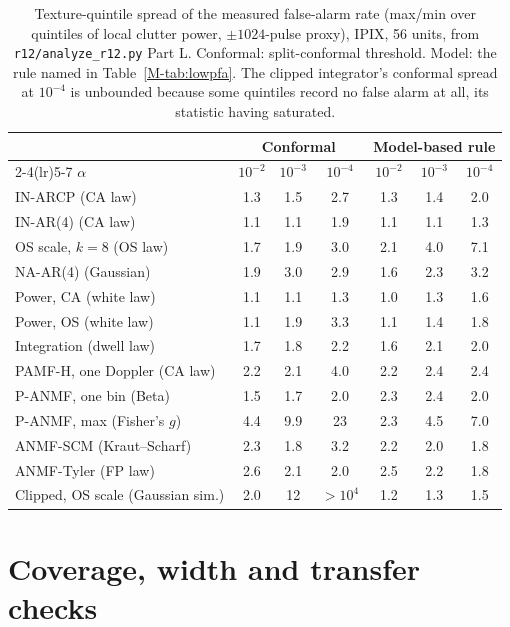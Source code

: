 \documentclass[10pt]{article}
\begin{document}
\begin{table}[h]
\centering\small
\caption{Texture-quintile spread of the measured false-alarm rate (max/min over quintiles of
local clutter power, $\pm1024$-pulse proxy), IPIX, 56 units, from \texttt{r12/analyze\_r12.py}
Part L. Conformal: split-conformal threshold. Model: the rule named in
Table~\ref{M-tab:lowpfa}. The clipped integrator's conformal spread at $10^{-4}$ is unbounded
because some quintiles record no false alarm at all, its statistic having saturated.}
\label{tab:pivot}
\begin{tabular}{lcccccc}
\toprule
 & \multicolumn{3}{c}{Conformal} & \multicolumn{3}{c}{Model-based rule}\\
\cmidrule(lr){2-4}\cmidrule(lr){5-7}
$\alpha$ & $10^{-2}$ & $10^{-3}$ & $10^{-4}$ & $10^{-2}$ & $10^{-3}$ & $10^{-4}$\\
\midrule
IN-ARCP (CA law) & 1.3 & 1.5 & 2.7 & 1.3 & 1.4 & 2.0\\
IN-AR(4) (CA law) & 1.1 & 1.1 & 1.9 & 1.1 & 1.1 & 1.3\\
OS scale, $k=8$ (OS law) & 1.7 & 1.9 & 3.0 & 2.1 & 4.0 & 7.1\\
NA-AR(4) (Gaussian) & 1.9 & 3.0 & 2.9 & 1.6 & 2.3 & 3.2\\
Power, CA (white law) & 1.1 & 1.1 & 1.3 & 1.0 & 1.3 & 1.6\\
Power, OS (white law) & 1.1 & 1.9 & 3.3 & 1.1 & 1.4 & 1.8\\
Integration (dwell law) & 1.7 & 1.8 & 2.2 & 1.6 & 2.1 & 2.0\\
PAMF-H, one Doppler (CA law) & 2.2 & 2.1 & 4.0 & 2.2 & 2.4 & 2.4\\
P-ANMF, one bin (Beta) & 1.5 & 1.7 & 2.0 & 2.3 & 2.4 & 2.0\\
P-ANMF, max (Fisher's $g$) & 4.4 & 9.9 & 23 & 2.3 & 4.5 & 7.0\\
ANMF-SCM (Kraut--Scharf) & 2.3 & 1.8 & 3.2 & 2.2 & 2.0 & 1.8\\
ANMF-Tyler (FP law) & 2.6 & 2.1 & 2.0 & 2.5 & 2.2 & 1.8\\
Clipped, OS scale (Gaussian sim.) & 2.0 & 12 & $>10^{4}$ & 1.2 & 1.3 & 1.5\\
\bottomrule
\end{tabular}
\end{table}


\section{Coverage, width and transfer checks}
\end{document}
